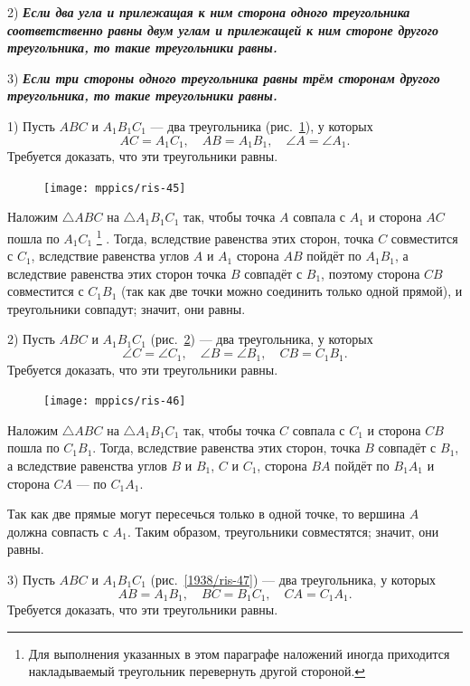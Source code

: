 \documentclass[oneside]{book}
\begin{document}
2) \textbf{\emph{Если два угла и прилежащая к ним сторона одного треугольника соответственно равны двум углам и прилежащей к ним стороне другого треугольника, то такие треугольники равны.}}

3) \textbf{\emph{Если три стороны одного треугольника равны трём сторонам другого треугольника, то такие треугольники равны.}}

1) Пусть $ABC$ и $A_1B_1C_1$ — два треугольника (рис.~\ref{1938/ris-45}), у которых
\[AC=A_1C_1,\quad AB = A_1B_1,\quad \angle A = \angle A_1.\]
Требуется доказать, что эти треугольники равны.

\begin{figure}
\centering
\texttt{[image: mppics/ris-45]}
\caption{}\label{1938/ris-45}
\end{figure}

Наложим $\triangle ABC$ на $\triangle A_1B_1C_1$ так, чтобы точка $A$ совпала с $A_1$ и сторона $AC$ пошла по $A_1C_1$%
\footnote{Для выполнения указанных в этом параграфе наложений иногда приходится накладываемый треугольник перевернуть другой стороной.}%
.
Тогда, вследствие равенства этих сторон, точка $C$ совместится с $C_1$, вследствие равенства углов $A$ и $A_1$ сторона $AB$ пойдёт по $A_1B_1$, а вследствие равенства этих сторон точка $B$ совпадёт с $B_1$, поэтому сторона $CB$ совместится с $C_1B_1$ (так как две точки можно соединить только одной прямой), и треугольники совпадут;
значит, они равны.


2) Пусть $ABC$ и $A_1B_1C_1$ (рис.~\ref{1938/ris-46}) — два треугольника, у которых
\[\angle C= \angle C_1,
\quad
\angle B=\angle B_1,
\quad
CB = C_1B_1.\]
Требуется доказать, что эти треугольники равны.

\begin{figure}
\centering
\texttt{[image: mppics/ris-46]}
\caption{}\label{1938/ris-46}
\end{figure}

Наложим $\triangle ABC$ на $\triangle A_1B_1C_1$ так, чтобы точка $C$ совпала с $C_1$ и сторона $CB$ пошла по $C_1B_1$.
Тогда, вследствие равенства этих сторон, точка $B$ совпадёт с $B_1$, а вследствие равенства углов $B$ и $B_1$, $C$ и $C_1$, сторона $BA$ пойдёт по $B_1A_1$ и сторона $CA$ — по $C_1A_1$.

Так как две прямые могут пересечься только в одной точке, то вершина $A$ должна совпасть с $A_1$.
Таким образом, треугольники совместятся;
значит, они равны.

3) Пусть $ABC$ и $A_1B_1C_1$ (рис.~\ref{1938/ris-47}) — два треугольника, у которых
\[AB = A_1B_1,
\quad
BC = B_1C_1,\quad 
CA = C_1A_1.
\]
Требуется доказать, что эти треугольники равны.
\end{document}
